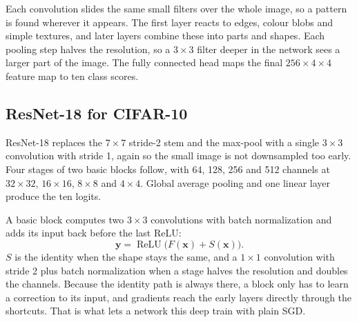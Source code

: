 \documentclass[11pt,a4paper]{article}
\begin{document}
Each convolution slides the same small filters over the whole image, so a pattern is found wherever it appears. The first layer reacts to edges, colour blobs and simple textures, and later layers combine these into parts and shapes. Each pooling step halves the resolution, so a $3\times3$ filter deeper in the network sees a larger part of the image. The fully connected head maps the final $256\times4\times4$ feature map to ten class scores.

\subsection{ResNet-18 for CIFAR-10}
ResNet-18 replaces the $7\times7$ stride-2 stem and the max-pool with a single $3\times3$ convolution with stride 1, again so the small image is not downsampled too early. Four stages of two basic blocks follow, with 64, 128, 256 and 512 channels at $32\times32$, $16\times16$, $8\times8$ and $4\times4$. Global average pooling and one linear layer produce the ten logits.

A basic block computes two $3\times3$ convolutions with batch normalization and adds its input back before the last ReLU:
\[
\mathbf{y}=\operatorname{ReLU}\bigl(F(\mathbf{x})+S(\mathbf{x})\bigr).
\]
$S$ is the identity when the shape stays the same, and a $1\times1$ convolution with stride 2 plus batch normalization when a stage halves the resolution and doubles the channels. Because the identity path is always there, a block only has to learn a correction to its input, and gradients reach the early layers directly through the shortcuts. That is what lets a network this deep train with plain SGD.
\end{document}
